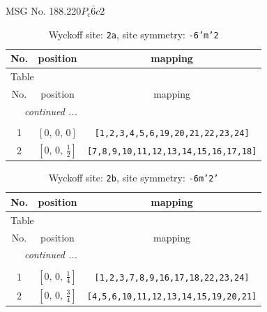 \documentclass[fleqn,8pt]{jsarticle}
\begin{document}
\setcounter{MaxMatrixCols}{32}

\renewcommand{\tablename}{Table~}
\renewcommand{\figurename}{Figure~}
\begin{center}
\LARGE
MSG No. 188.220\quad$P_{c}\bar{6}c2$
\end{center}
\renewcommand{\arraystretch}{1.2}
\begin{longtable}{ccc}
\caption{Wyckoff site: {\tt 2a}, site symmetry: {\tt -6'm'2}}
 \\
 \hline \hline
No. & position & mapping \\ \hline \endfirsthead

\multicolumn{2}{l}{\tablename\ \thetable{}} \\
 \hline \hline
No. & position & mapping \\ \hline \endhead

 \hline \hline
\multicolumn{2}{r}{\footnotesize\it continued ...} \\ \endfoot

 \hline \hline
\multicolumn{2}{r}{} \\ \endlastfoot

1 & $\left[ 0,\, 0,\, 0 \right]$ & {\tt [1,2,3,4,5,6,19,20,21,22,23,24]} \\ \hline
2 & $\left[ 0,\, 0,\, \frac{1}{2} \right]$ & {\tt [7,8,9,10,11,12,13,14,15,16,17,18]} \\
\end{longtable}
\renewcommand{\arraystretch}{1.2}
\begin{longtable}{ccc}
\caption{Wyckoff site: {\tt 2b}, site symmetry: {\tt -6m'2'}}
 \\
 \hline \hline
No. & position & mapping \\ \hline \endfirsthead

\multicolumn{2}{l}{\tablename\ \thetable{}} \\
 \hline \hline
No. & position & mapping \\ \hline \endhead

 \hline \hline
\multicolumn{2}{r}{\footnotesize\it continued ...} \\ \endfoot

 \hline \hline
\multicolumn{2}{r}{} \\ \endlastfoot

1 & $\left[ 0,\, 0,\, \frac{1}{4} \right]$ & {\tt [1,2,3,7,8,9,16,17,18,22,23,24]} \\ \hline
2 & $\left[ 0,\, 0,\, \frac{3}{4} \right]$ & {\tt [4,5,6,10,11,12,13,14,15,19,20,21]} \\
\end{longtable}
\end{document}
